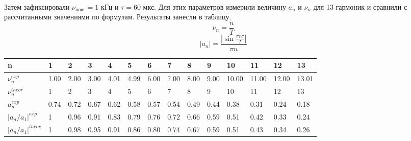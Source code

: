 \documentclass[a4paper,12pt]{article}
\begin{document}
\begin{figure}
    \\
\end{figure}

Затем зафиксировали $\nu_{\text{повт}} = 1$ кГц и $\tau = 60$ мкс. Для этих параметров измерили величину $a_n$ и $\nu_n$ для 13 гармоник и сравнили с рассчитанными значениями по формулам. Результаты занесли в таблицу.
\[\nu_n = \frac{n}{T} \]
\[|a_n| = \frac{|\sin{ \frac{\pi n \tau}{T}}|}{\pi n}\]


\begin{table}[]
\begin{tabular}{|l|l|l|l|l|l|l|l|l|l|l|l|l|l|}
\hline
n                        & 1    & 2    & 3    & 4    & 5    & 6    & 7    & 8    & 9    & 10    & 11    & 12    & 13    \\ \hline
$\nu_n^{exp}$            & 1.00 & 2.00 & 3.00 & 4.01 & 4.99 & 6.00 & 7.00 & 8.00 & 9.00 & 10.00 & 11.00 & 12.00 & 13.01 \\ \hline
$\nu_n^{theor}$          & 1    & 2    & 3    & 4    & 5    & 6    & 7    & 8    & 9    & 10    & 11    & 12    & 13    \\ \hline
$a_n^{exp}$                & 0.74 & 0.72 & 0.67 & 0.62 & 0.58 & 0.57 & 0.54 & 0.49 & 0.44 & 0.38  & 0.31  & 0.24  & 0.18  \\ \hline
$|a_n / a_1|^{exp}$          & 1    & 0.96 & 0.91 & 0.83 & 0.79 & 0.76 & 0.72 & 0.66 & 0.59 & 0.51  & 0.42  & 0.33  & 0.24  \\ \hline
$|a_n / a_1|^{theor}$        & 1    & 0.98 & 0.95 & 0.91 & 0.86 & 0.80 & 0.74 & 0.67 & 0.59 & 0.51  & 0.43  & 0.34  & 0.26  \\ \hline
\end{tabular}
\end{table}
\end{document}

